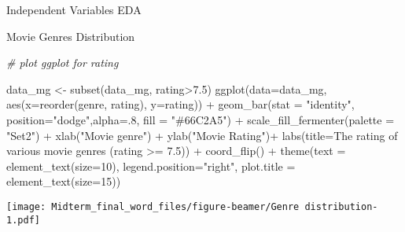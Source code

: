 \documentclass[
  ignorenonframetext,
]{beamer}
\newenvironment{Shaded}{\begin{snugshade}}{\end{snugshade}}
\newcommand{\AttributeTok}[1]{\textcolor[rgb]{0.77,0.63,0.00}{#1}}
\newcommand{\CommentTok}[1]{\textcolor[rgb]{0.56,0.35,0.01}{\textit{#1}}}
\newcommand{\DecValTok}[1]{\textcolor[rgb]{0.00,0.00,0.81}{#1}}
\newcommand{\FloatTok}[1]{\textcolor[rgb]{0.00,0.00,0.81}{#1}}
\newcommand{\FunctionTok}[1]{\textcolor[rgb]{0.00,0.00,0.00}{#1}}
\newcommand{\NormalTok}[1]{#1}
\newcommand{\OtherTok}[1]{\textcolor[rgb]{0.56,0.35,0.01}{#1}}
\newcommand{\SpecialCharTok}[1]{\textcolor[rgb]{0.00,0.00,0.00}{#1}}
\newcommand{\StringTok}[1]{\textcolor[rgb]{0.31,0.60,0.02}{#1}}
\begin{document}
\begin{frame}[fragile]{Independent Variables EDA}
\begin{block}{Movie Genres Distribution}
\protect\hypertarget{movie-genres-distribution}{}
\begin{Shaded}
\begin{Highlighting}[]
\CommentTok{\# plot ggplot for rating}

\NormalTok{data\_mg }\OtherTok{\textless{}{-}} \FunctionTok{subset}\NormalTok{(data\_mg, rating}\SpecialCharTok{\textgreater{}}\FloatTok{7.5}\NormalTok{)}
\FunctionTok{ggplot}\NormalTok{(}\AttributeTok{data=}\NormalTok{data\_mg, }\FunctionTok{aes}\NormalTok{(}\AttributeTok{x=}\FunctionTok{reorder}\NormalTok{(genre, rating), }\AttributeTok{y=}\NormalTok{rating)) }\SpecialCharTok{+} 
  \FunctionTok{geom\_bar}\NormalTok{(}\AttributeTok{stat =} \StringTok{"identity"}\NormalTok{, }\AttributeTok{position=}\StringTok{"dodge"}\NormalTok{,}\AttributeTok{alpha=}\NormalTok{.}\DecValTok{8}\NormalTok{, }\AttributeTok{fill =} \StringTok{"\#66C2A5"}\NormalTok{) }\SpecialCharTok{+} 
    \FunctionTok{scale\_fill\_fermenter}\NormalTok{(}\AttributeTok{palette =} \StringTok{"Set2"}\NormalTok{) }\SpecialCharTok{+} 
      \FunctionTok{xlab}\NormalTok{(}\StringTok{"Movie genre"}\NormalTok{) }\SpecialCharTok{+} 
        \FunctionTok{ylab}\NormalTok{(}\StringTok{"Movie Rating"}\NormalTok{)}\SpecialCharTok{+} 
          \FunctionTok{labs}\NormalTok{(}\AttributeTok{title=}\StringTok{\textquotesingle{}The rating of various movie genres (rating \textgreater{}= 7.5)\textquotesingle{}}\NormalTok{) }\SpecialCharTok{+} 
            \FunctionTok{coord\_flip}\NormalTok{() }\SpecialCharTok{+} 
              \FunctionTok{theme}\NormalTok{(}\AttributeTok{text =} \FunctionTok{element\_text}\NormalTok{(}\AttributeTok{size=}\DecValTok{10}\NormalTok{), }\AttributeTok{legend.position=}\StringTok{"right"}\NormalTok{, }\AttributeTok{plot.title =} \FunctionTok{element\_text}\NormalTok{(}\AttributeTok{size=}\DecValTok{15}\NormalTok{))}
\end{Highlighting}
\end{Shaded}

\texttt{[image: Midterm\_final\_word\_files/figure-beamer/Genre distribution-1.pdf]}


\end{block}
\end{frame}
\end{document}
